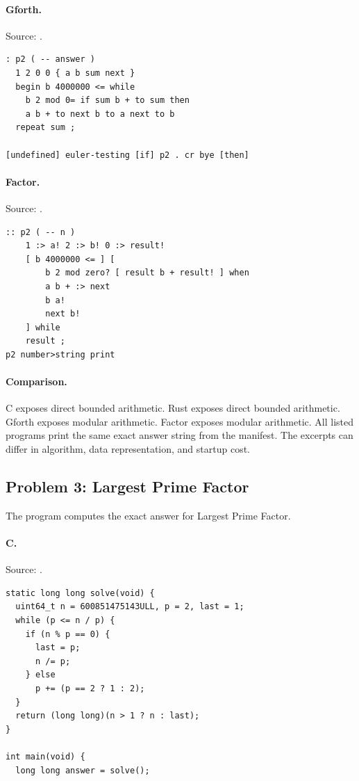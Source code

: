 \paragraph{Gforth.} Source: .
\begin{lstlisting}
: p2 ( -- answer )
  1 2 0 0 { a b sum next }
  begin b 4000000 <= while
    b 2 mod 0= if sum b + to sum then
    a b + to next b to a next to b
  repeat sum ;

[undefined] euler-testing [if] p2 . cr bye [then]
\end{lstlisting}

\paragraph{Factor.} Source: .
\begin{lstlisting}
:: p2 ( -- n )
    1 :> a! 2 :> b! 0 :> result!
    [ b 4000000 <= ] [
        b 2 mod zero? [ result b + result! ] when
        a b + :> next
        b a!
        next b!
    ] while
    result ;
p2 number>string print
\end{lstlisting}

\paragraph{Comparison.}
C exposes direct bounded arithmetic. Rust exposes direct bounded arithmetic. Gforth exposes modular arithmetic. Factor exposes modular arithmetic.
All listed programs print the same exact answer string from the manifest. The excerpts can differ in algorithm, data representation, and startup cost.

\subsection{Problem 3: Largest Prime Factor}
\label{walkthrough:p3}
The program computes the exact answer for Largest Prime Factor.

\paragraph{C.} Source: .
\begin{lstlisting}
static long long solve(void) {
  uint64_t n = 600851475143ULL, p = 2, last = 1;
  while (p <= n / p) {
    if (n % p == 0) {
      last = p;
      n /= p;
    } else
      p += (p == 2 ? 1 : 2);
  }
  return (long long)(n > 1 ? n : last);
}

int main(void) {
  long long answer = solve();
\end{lstlisting}

